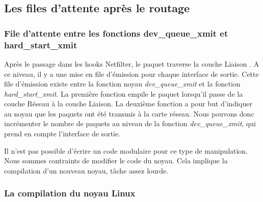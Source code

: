 \documentclass[a4paper]{article}
\begin{document}
\subsection{Les files d'attente après le routage}

\subsubsection{File d'attente entre les fonctions dev\_queue\_xmit et hard\_start\_xmit}

Après le passage dans les hooks Netfilter, le paquet traverse la couche Liaison \cite{intel} \cite{stack}. A ce niveau, il y a une mise en file d’émission pour chaque interface de sortie. Cette file d’émission existe entre la fonction noyau \textit{dev\_queue\_xmit} et la fonction \textit{hard\_start\_xmit}. La première fonction empile le paquet lorsqu’il passe de la couche Réseau à la couche Liaison. La deuxième fonction a pour but d’indiquer au noyau que les paquets ont été transmis à la carte réseau. Nous pouvons donc incrémenter le nombre de paquets au niveau de la fonction \textit{dev\_queue\_xmit}, qui prend en compte l’interface de sortie.

Il n’est pas possible d’écrire un code modulaire pour ce type de manipulation. Nous sommes contraints de modifier le code du noyau. Cela implique la compilation d’un nouveau noyau, tâche assez lourde. 

\subsubsection{La compilation du noyau Linux}
\end{document}
